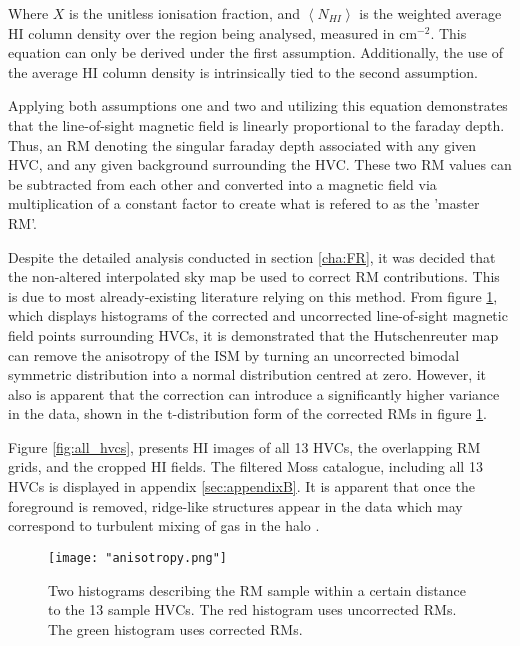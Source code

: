 Where $X$ is the unitless ionisation fraction, and $\left<N_{HI}\right>$ is the weighted average HI column density over the region being analysed, measured in $\mathrm{cm}^{-2}$. This equation can only be derived under the first assumption. Additionally, the use of the average HI column density is intrinsically tied to the second assumption.


Applying both assumptions one and two and utilizing this equation demonstrates that the line-of-sight magnetic field is linearly proportional to the faraday depth. Thus, an RM denoting the singular faraday depth associated with any given HVC, and any given background surrounding the HVC. These two RM values can be subtracted from each other and converted into a magnetic field via multiplication of a constant factor to create what is refered to as the 'master RM'.


Despite the detailed analysis conducted in section \ref{cha:FR}, it was decided that the non-altered interpolated sky map be used to correct RM contributions. This is due to most already-existing literature relying on this method. From figure \ref{fig:anisotropy}, which displays histograms of the corrected and uncorrected line-of-sight magnetic field points surrounding HVCs, it is demonstrated that the Hutschenreuter map can remove the anisotropy of the ISM by turning an uncorrected bimodal symmetric distribution into a normal distribution centred at zero. However, it also is apparent that the correction can introduce a significantly higher variance in the data, shown in the t-distribution form of the corrected RMs in figure \ref{fig:anisotropy}.

Figure \ref{fig:all_hvcs}, presents HI images of all 13 HVCs, the overlapping RM grids, and the cropped HI fields. The filtered Moss catalogue, including all 13 HVCs is displayed in appendix \ref{sec:appendixB}. It is apparent that once the foreground is removed, ridge-like structures appear in the data which may correspond to turbulent mixing of gas in the halo \citep{ID69, ID30}.

\begin{figure}
    \texttt{[image: "anisotropy.png"]}
    \centering
    \caption{Two histograms describing the RM sample within a certain distance to the 13 sample HVCs. The red histogram uses uncorrected RMs. The green histogram uses corrected RMs.}
    \label{fig:anisotropy}
\end{figure}

%

